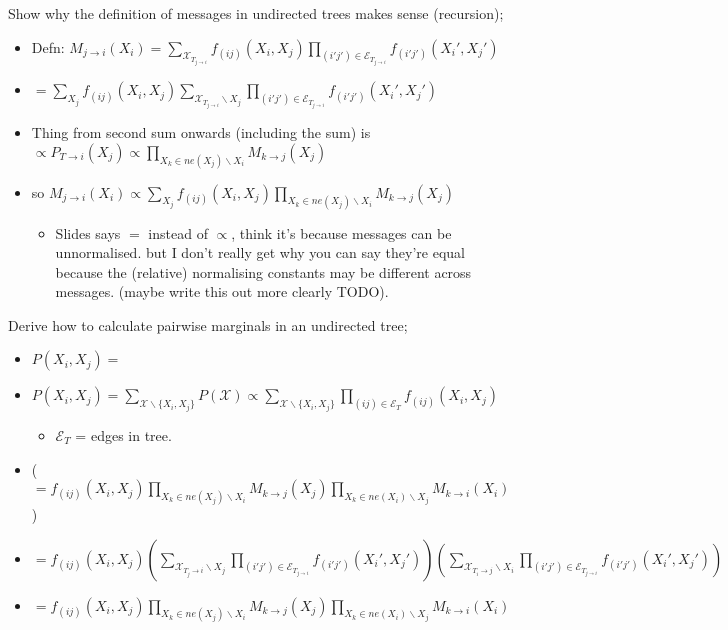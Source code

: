 \documentclass{article}
\begin{document}
Show why the definition of messages in undirected trees makes sense (recursion);  \begin{itemize} \item Defn: $M_{j\rightarrow i}(X_i) =\sum_{\mathcal{X}_{T_{j\rightarrow i}}}f_{(ij)}(X_i, X_j)\prod_{(i'j')\in \mathcal{E}_T_{j\rightarrow i}} f_{(i'j')}(X_i', X_j')$ \item $=\sum_{X_j}f_{(ij)}(X_i, X_j)\sum_{\mathcal{X}_{T_{j\rightarrow i}}\backslash X_j}\prod_{(i'j')\in \mathcal{E}_T_{j\rightarrow i}} f_{(i'j')}(X_i', X_j')$ \item Thing from second sum onwards (including the sum) is $\propto P_{T\rightarrow i}(X_j)\propto \prod_{X_k\in ne(X_j)\backslash X_i} M_{k\rightarrow j}(X_j)$ \item so $M_{j\rightarrow i}(X_i) \propto \sum_{X_j}f_{(ij)}(X_i, X_j)\prod_{X_k\in ne(X_j)\backslash X_i} M_{k\rightarrow j}(X_j)$ \begin{itemize} \item Slides says $=$ instead of $\propto$, think it's because messages can be unnormalised. but I don't really get why you can say they're equal because the (relative) normalising constants may be different across messages. (maybe write this out more clearly TODO).  \end{itemize} \end{itemize}

Derive how to calculate pairwise marginals in an undirected tree; \begin{itemize} \item $P(X_i, X_j) = $ \item $P(X_i, X_j) = \sum_{\mathcal{X}\backslash\{X_i, X_j\}} P(\mathcal{X}) \propto \sum_{\mathcal{X}\backslash\{X_i, X_j\}}\prod_{(ij)\in \mathcal{E}_T} f_{(ij)}(X_i, X_j)$ \begin{itemize} \item $\mathcal{E}_T$ = edges in tree.  \end{itemize} \item ($=f_{(ij)}(X_i, X_j)\prod_{X_k\in ne(X_j)\backslash X_i}M_{k\rightarrow j}(X_j)\prod_{X_k\in ne(X_i)\backslash X_j}M_{k\rightarrow i}(X_i)$) \item $= f_{(ij)}(X_i, X_j) (\sum_{\mathcal{X}_{T_j\rightarrow i}\backslash X_j} \prod_{(i'j')\in \mathcal{E}_T_{j\rightarrow i}} f_{(i'j')}(X_i', X_j')) (\sum_{\mathcal{X}_{T_i\rightarrow j}\backslash X_i} \prod_{(i'j')\in \mathcal{E}_T_{j\rightarrow i}} f_{(i'j')}(X_i', X_j'))$ \item $= f_{(ij)}(X_i, X_j) \prod_{X_k\in ne(X_j)\backslash X_i}M_{k\rightarrow j}(X_j) \prod_{X_k\in ne(X_i)\backslash X_j}M_{k\rightarrow i}(X_i)$ \end{itemize}
\end{document}
